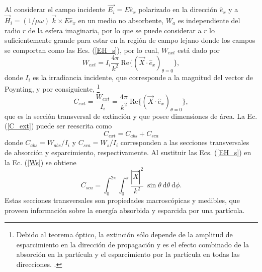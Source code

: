 Al considerar el campo incidente $\Vec{E_i}=E\hat{e}_x$ polarizado en la dirección $\hat{e}_x$ y a $\Vec{H}_i=(1/\mu \omega)\: \Vec{k} \times E \hat{e}_x$ en un medio no absorbente, $W_a$ es independiente del radio $r$ de la esfera imaginaria, por lo que se puede considerar a $r$ lo suficientemente grande para estar en la región de campo lejano donde los campos se comportan como las Ecs. (\ref{EH_s}), por lo cual, $W_{ext}$ está dado por \cite{Bohren}
\begin{equation*}
	W_{ext}=I_i\frac{4\pi}{k^2}\:\text{Re}\{(\Vec{X}\cdot\hat{e}_x)_{\theta=0}\},
\end{equation*}
donde $I_i$ es la irradiancia incidente, que corresponde a la magnitud del vector de Poynting, y por consiguiente, \footnote{Debido al teorema óptico, la extinción sólo depende de la amplitud de esparcimiento en la dirección de propagación y es el efecto combinado de la absorción en la partícula y el esparcimiento por la partícula en todas las direcciones. \cite{Bohren}.}
\begin{equation}
	C_{ext}=\frac{W_{ext}}{I_i}=\frac{4\pi}{k^2}\:\text{Re}\{(\Vec{X}\cdot\hat{e}_x)_{\theta=0}\}, \label{C_ext}
\end{equation}
que es la sección transversal de extinción y que posee dimensiones de área. La Ec. (\ref{C_ext}) puede ser reescrita como \cite{Bohren}
\begin{equation}
	C_{ext}=C_{abs}+C_{sca}
	\label{C}
\end{equation}
donde $C_{abs}=W_{abs}/I_i$ y $C_{sca}=W_s/I_i$ corresponden a las secciones transversales de absorción y esparcimiento, respectivamente. Al sustituir las Ecs. (\ref{EH_s}) en la Ec. (\ref{Ws}) se obtiene
\begin{equation}
	C_{sca}=\int_0^{2\pi}\int_0^{\pi}\frac{|\Vec{X}|^2}{k^2}\:\sin\theta\: \text{d}\theta\:\text{d}\phi.
	\label{C_sca_general}
\end{equation}
Estas secciones transversales son propiedades macroscópicas y medibles, que proveen información sobre la energía absorbida y esparcida por una partícula.  \\

